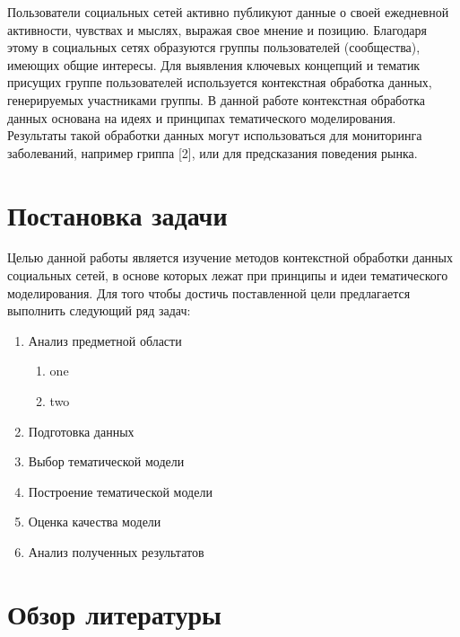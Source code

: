 \documentclass[a4paper]{report}
\begin{document}
Пользователи социальных сетей активно публикуют данные о своей ежедневной активности, чувствах и мыслях, выражая свое мнение и позицию. Благодаря этому в социальных сетях образуются группы пользователей (сообщества), имеющих общие интересы. Для выявления ключевых концепций и тематик присущих группе пользователей используется контекстная обработка данных, генерируемых участниками группы. В данной работе контекстная обработка данных основана на идеях и принципах тематического моделирования. Результаты такой обработки данных могут использоваться для мониторинга заболеваний, например гриппа [2], или для предсказания поведения рынка. \\

	 
	\section{Постановка задачи}
	Целью данной работы является изучение методов контекстной обработки данных социальных сетей, в основе которых лежат при принципы и идеи тематического моделирования. Для того чтобы достичь поставленной цели предлагается выполнить следующий ряд задач:
	
	
	\renewcommand{\labelenumi}{\arabic{enumi}.}
	\renewcommand{\labelenumii}{\arabic{enumi}.\arabic{enumii}}

	\begin{enumerate}
	\item{Анализ предметной области}
	\begin{enumerate}
	\item{one}
	\item{two}
	\end{enumerate}
	\item{Подготовка данных}
	\item{Выбор тематической модели}
	\item{Построение тематической модели}
	\item{Оценка качества модели}
	\item{Анализ полученных результатов}
	\end{enumerate}
	
	\section{Обзор литературы}
	
	
\end{document}
